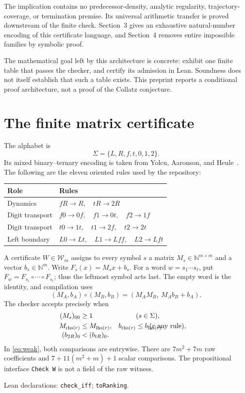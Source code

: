 \documentclass[11pt,a4paper]{article}
\theoremstyle{definition}
\newcommand{\NN}{\mathbb N}
\newcommand{\name}[1]{{\small\texttt{#1}}}
\newcommand{\source}[1]{\par{\footnotesize\color{ink}Lean declarations: #1.}\par}
\begin{document}
The implication contains no predecessor-density, analytic regularity,
trajectory-coverage, or termination premise. Its universal arithmetic transfer
is proved downstream of the finite check. Section~3 gives an exhaustive
natural-number encoding of this certificate language, and Section~4 removes
entire impossible families by symbolic proof.

The mathematical goal left by this architecture is concrete: exhibit one
finite table that passes the checker, and certify its admission in Lean.
Soundness does not itself establish that such a table exists. This preprint
reports a conditional proof architecture, not a proof of the Collatz conjecture.

\newpage
\section{The finite matrix certificate}
The alphabet is
\[
 \Sigma=\{L,R,f,t,0,1,2\}.
\]
Its mixed binary--ternary encoding is taken from Yolcu, Aaronson, and
Heule~\cite{yah}. The following are the eleven oriented rules used by the
repository:
\begin{center}
\begin{tabular}{@{}ll@{}}
\toprule
Role & Rules\\
\midrule
Dynamics & $fR\to R,\quad tR\to 2R$\\
Digit transport & $f0\to0f,\quad f1\to0t,\quad f2\to1f$\\
Digit transport & $t0\to1t,\quad t1\to2f,\quad t2\to2t$\\
Left boundary & $L0\to Lt,\quad L1\to Lff,\quad L2\to Lft$\\
\bottomrule
\end{tabular}
\end{center}

A certificate $W\in\mathcal W_m$ assigns to every symbol $s$ a matrix
$M_s\in\NN^{m\times m}$ and a vector $b_s\in\NN^m$.
Write $F_s(x)=M_sx+b_s$. For a word $w=s_1\cdots s_\ell$, put
$F_w=F_{s_1}\circ\cdots\circ F_{s_\ell}$; thus the leftmost symbol acts last.
The empty word is the identity, and compilation uses
\[
 (M_A,b_A)\circ(M_B,b_B)=(M_AM_B,\ M_Ab_B+b_A).
\]
The checker accepts precisely when
\begin{align}
 (M_s)_{00}&\ge1 &&(s\in\Sigma),\label{eq:positive}\\
 M_{\mathrm{rhs}(r)}&\le M_{\mathrm{lhs}(r)},&
 b_{\mathrm{rhs}(r)}&\le b_{\mathrm{lhs}(r)}
 &&\hspace{-10mm}(r\text{ any rule}),\label{eq:weak}\\[-2pt]
 (b_{2R})_0&<(b_{tR})_0.\label{eq:strict}
\end{align}
In \eqref{eq:weak}, both comparisons are entrywise.
There are $7m^2+7m$ raw coefficients and
$7+11(m^2+m)+1$ scalar comparisons.
The propositional interface \name{Check W} is not a field of the raw witness.
\source{\name{check\_iff}; \name{toRanking}}
\end{document}
